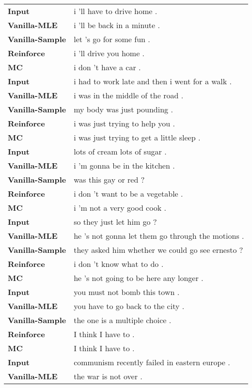 \documentclass[11pt]{article}
\begin{document}
\begin{table*}[!htb]
\centering
\footnotesize
\begin{tabular}{p{4cm}p{8cm}}\hline

{\bf Input}&i 'll have to drive home .\\
{\bf Vanilla-MLE}&i 'll be back in a minute .\\
{\bf Vanilla-Sample}&let 's go for some fun .\\
{\bf Reinforce}&i 'll drive you home .\\
{\bf MC}&i don 't have a car .\\\hline
{\bf Input}&i had to work late and then i went for a walk .\\
{\bf Vanilla-MLE}&i was in the middle of the road .\\
{\bf Vanilla-Sample}&my body was just pounding .\\
{\bf Reinforce}&i was just trying to help you .\\
{\bf MC}&i was just trying to get a little sleep .\\\hline
{\bf Input}&lots of cream lots of sugar .\\
{\bf Vanilla-MLE}&i 'm gonna be in the kitchen .\\
{\bf Vanilla-Sample}&was this gay or red ?\\
{\bf Reinforce}&i don 't want to be a vegetable .\\
{\bf MC}&i 'm not a very good cook .\\\hline
{\bf Input}&so they just let him go ?\\
{\bf Vanilla-MLE}&he 's not gonna let them go through the motions .\\
{\bf Vanilla-Sample}&they asked him whether we could go see ernesto ?\\
{\bf Reinforce}&i don 't know what to do .\\
{\bf MC}&he 's not going to be here any longer .\\\hline
{\bf Input}&you must not bomb this town .\\
{\bf Vanilla-MLE}&you have to go back to the city .\\
{\bf Vanilla-Sample}&the one is a multiple choice .\\
{\bf Reinforce}&I think I have to .\\
{\bf MC}&I think I have to .\\\hline
{\bf Input}&communism recently failed in eastern europe .\\
{\bf Vanilla-MLE}&the war is not over .\\

\end{tabular}
\end{table*}
\end{document}
